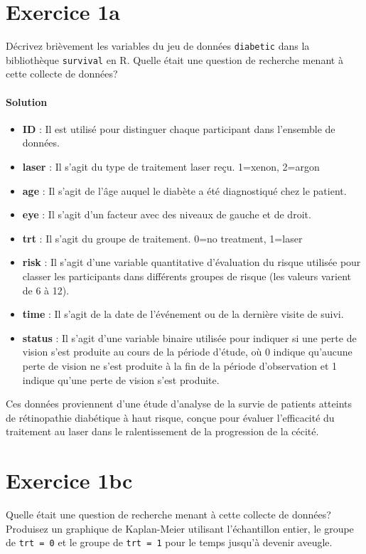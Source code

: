 \documentclass[../main.tex]{subfiles}
\begin{document}
\begin{CJK*}{UTF8}{gbsn}

\section*{Exercice 1a}
Décrivez brièvement les variables du jeu de données 
\texttt{diabetic} dans la bibliothèque \texttt{survival} en R.
Quelle était une question de recherche menant à cette collecte de données?

\paragraph{Solution}

\begin{itemize}
  \item \textbf{ID} : Il est utilisé pour distinguer chaque participant dans l'ensemble de données.
  \item \textbf{laser} : Il s'agit du type de traitement laser reçu. 1=xenon, 2=argon
  \item \textbf{age} : Il s'agit de l'âge auquel le diabète a été diagnostiqué chez le patient.
  \item \textbf{eye} : Il s'agit d'un facteur avec des niveaux de gauche et de droit.
  \item \textbf{trt} : Il s'agit du groupe de traitement. 0=no treatment, 1=laser
  \item \textbf{risk} : Il s'agit d'une variable quantitative d'évaluation du risque utilisée pour classer les participants dans différents groupes de risque (les valeurs varient de 6 à 12).
  \item \textbf{time} : Il s'agit de la date de l'événement ou de la dernière visite de suivi.
  \item \textbf{status} : Il s'agit d'une variable binaire utilisée pour indiquer si une perte de vision s'est produite au cours de la période d'étude, où 0 indique qu'aucune perte de vision ne s'est produite à la fin de la période d'observation et 1 indique qu'une perte de vision s'est produite.
\end{itemize}

Ces données proviennent d'une étude d'analyse de la survie de patients atteints de rétinopathie diabétique à haut risque, conçue pour évaluer l'efficacité du traitement au laser dans le ralentissement de la progression de la cécité.

\section*{Exercice 1bc}
Quelle était une question de recherche menant à cette collecte de données?
Produisez un graphique de Kaplan-Meier utilisant l'échantillon entier,
le groupe de \texttt{trt = 0} et le groupe de \texttt{trt = 1} 
pour le temps jusqu'à devenir aveugle.


\end{CJK*}
\end{document}
